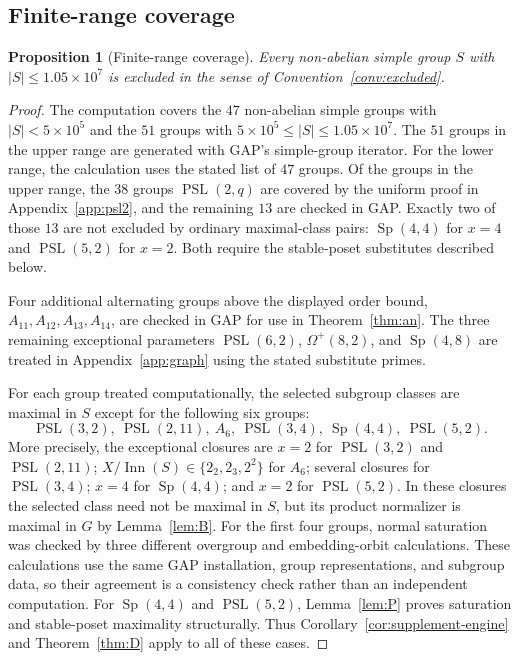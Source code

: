 \documentclass[11pt]{amsart}
\newtheorem{proposition}[theorem]{Proposition}
\theoremstyle{definition}
\theoremstyle{remark}
\DeclareMathOperator{\Inn}{Inn}
\DeclareMathOperator{\PSL}{PSL}
\DeclareMathOperator{\Sp}{Sp}
\begin{document}
\subsection{Finite-range coverage}

\begin{proposition}[Finite-range coverage]\label{prop:base}
Every non-abelian simple group $S$ with $|S|\leq1.05\times10^7$ is excluded
in the sense of Convention~\ref{conv:excluded}.
\end{proposition}

\begin{proof}
The computation covers the $47$ non-abelian simple groups with
$|S|<5\times10^5$ and the $51$ groups with
$5\times10^5\leq|S|\leq1.05\times10^7$. The $51$ groups in the upper range
are generated with GAP's simple-group iterator. For the lower range, the
calculation uses the stated list of $47$ groups. Of the groups in the upper
range, the $38$ groups $\PSL(2,q)$ are covered by the uniform proof in
Appendix~\ref{app:psl2}, and the remaining $13$ are checked in GAP.
Exactly two of those $13$ are not excluded by ordinary maximal-class pairs:
$\Sp(4,4)$ for $x=4$ and $\PSL(5,2)$ for $x=2$. Both require the
stable-poset substitutes described below.

Four additional alternating groups above the displayed order bound,
$A_{11},A_{12},A_{13},A_{14}$, are checked in GAP for use in
Theorem~\ref{thm:an}. The three remaining exceptional parameters
$\PSL(6,2)$, $\Omega^+(8,2)$, and $\Sp(4,8)$ are treated in
Appendix~\ref{app:graph} using the stated substitute primes.

For each group treated computationally, the selected subgroup classes are
maximal in $S$ except for the following six groups:
\[
 \PSL(3,2),\ \PSL(2,11),\ A_6,\ \PSL(3,4),\ \Sp(4,4),\ \PSL(5,2).
\]
More precisely, the exceptional closures are $x=2$ for $\PSL(3,2)$ and
$\PSL(2,11)$; $X/\Inn(S)\in\{2_2,2_3,2^2\}$ for $A_6$; several
closures for $\PSL(3,4)$; $x=4$ for $\Sp(4,4)$; and $x=2$ for
$\PSL(5,2)$. In these closures the selected class need not be maximal in $S$,
but its product normalizer is maximal in $G$ by Lemma~\ref{lem:B}. For the
first four groups, normal saturation was checked by three different
overgroup and embedding-orbit calculations. These calculations use the same
GAP installation, group representations, and subgroup data, so their agreement
is a consistency check rather than an independent computation. For
$\Sp(4,4)$ and $\PSL(5,2)$,
Lemma~\ref{lem:P} proves saturation and stable-poset maximality structurally.
Thus Corollary~\ref{cor:supplement-engine} and Theorem~\ref{thm:D} apply to
all of these cases.


\end{proof}
\end{document}
